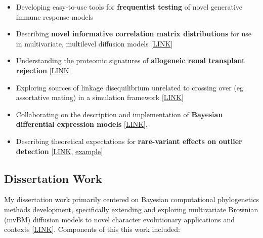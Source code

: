 \documentclass[12pt]{article}
\begin{document}
\begin{itemize}[noitemsep]
\item Developing easy-to-use tools for \textbf{frequentist testing} of novel generative immune response models

\item Describing \textbf{novel informative correlation matrix distributions} for use in multivariate,  multilevel diffusion models [\href{https://github.com/NikVetr/dissertation\_work/blob/master/informative\_corrmat\_prior.R}{LINK}]

\item Understanding the proteomic signatures of \textbf{allogeneic renal transplant rejection} [\href{https://github.com/NikVetr/minor\_scripts/blob/c8926965b0c6dd9158351cf5836cbc76261f6830/postdoc/renal\_transplant\_censored\_poisson.R}{LINK}]

\item Exploring sources of linkage disequilibrium unrelated to crossing over (eg assortative mating) in a simulation framework [\href{https://github.com/NikVetr/montgomery\_lab/blob/61e2ac4b0fea0ee7f5bf31590a40378f0027264a/assortative\_mating.R}{LINK}]

\item Collaborating on the description and implementation of \textbf{Bayesian differential expression models} \href{https://github.com/bob-carpenter/BayesExpress/blob/main/latex/bayes-express/bayes-express.tex}{[LINK]},  

\item Describing theoretical expectations for \textbf{rare-variant effects on outlier detection} [\href{https://github.com/NikVetr/montgomery_lab/blob/61e2ac4b0fea0ee7f5bf31590a40378f0027264a/prop\_outliers\_zscores\_animation.R#L4}{LINK}, \href{https://drive.google.com/file/d/1mSp22\_cqarfMDFnS55Pjg7qqmkVnk1GI}{example}]

\end{itemize}

\subsection{Dissertation Work}

My dissertation work primarily centered on Bayesian computational phylogenetics methods development, specifically extending and exploring multivariate Brownian (mvBM) diffusion models to novel character evolutionary applications and contexts [\href{https://github.com/NikVetr/papers/blob/main/dissertation/dissertation_lashinsky_2020.pdf}{LINK}]. Components of this this work included:
\end{document}
